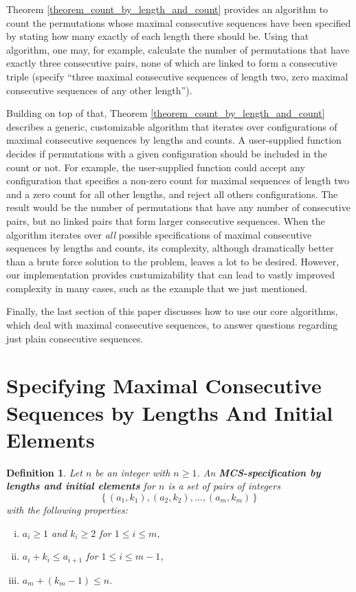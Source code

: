 \documentclass{article}
\newtheorem{definition}[theorem]{Definition}
\begin{document}
Theorem \ref{theorem_count_by_length_and_count}
provides an algorithm to count the permutations whose maximal consecutive sequences have been specified by
stating how many exactly of each length there should be. Using that algorithm, one may, for example,
calculate the number of permutations that have exactly three consecutive pairs, none of which are linked
to form a consecutive triple (specify ``three maximal consecutive sequences of length two, zero maximal
consecutive sequences of any other length'').

Building on top of that, Theorem \ref{theorem_count_by_length_and_count} describes a generic, customizable algorithm
that iterates over configurations of maximal consecutive sequences by lengths and counts.
A user-supplied function decides if permutations with a given configuration should be included in the count or not.
For example, the user-supplied function could accept any configuration that specifies a non-zero count for maximal
sequences of length two and a zero count for all other lengths, and reject all others configurations.
The result would be the number
of permutations that have any number of consecutive pairs, but no linked pairs that form larger
consecutive sequences. When the algorithm iterates over {\it all} possible specifications of maximal
consecutive sequences by lengths and counts, its complexity, although dramatically better than a brute force
solution to the problem, leaves a lot to be desired. However, our implementation provides custumizability
that can lead to vastly improved complexity in many cases, such as the example that we just mentioned.

Finally, the last section of this paper discusses how to use our core algorithms, which deal with
maximal consecutive sequences, to answer questions regarding just plain consecutive sequences.

\section{Specifying Maximal Consecutive Sequences by Lengths And Initial Elements}

\begin{definition} \label{def_mcs_spec_by_length_and_initial_element}
  Let $n$ be an integer with $n\geq 1$. An {\bf MCS-specification by lengths and initial elements} for $n$ is a
  set of pairs of integers $$\{\,(a_1, k_1), (a_2, k_2), \ldots,(a_m, k_m)\,\}$$ with the following properties:
  \begin{enumerate}[(i)]
  \item
    $a_i \geq 1$ and $k_i \geq 2$ for $1\leq i \leq m$,
  \item
    $a_i + k_i \leq a_{i+1}$ for $1\leq i \leq m-1$,
  \item
    $a_m + (k_m-1) \leq n$.
  \end{enumerate}
\end{definition}
\end{document}
